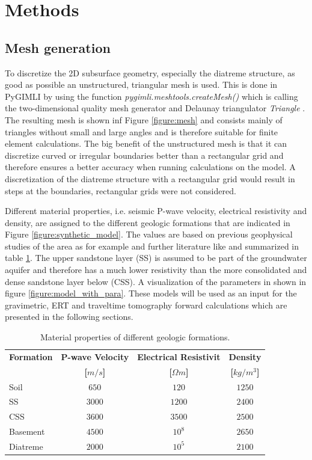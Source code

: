 \section{Methods}\label{section:Methods}

\subsection{Mesh generation}\label{section:Mesh}
To discretize the 2D subsurface geometry, especially the diatreme structure, as good as possible an unstructured, triangular mesh is used. This is done in PyGIMLI by using the function \textit{pygimli.meshtools.createMesh()} which is calling the two-dimensional quality mesh generator and Delaunay triangulator \textit{Triangle} \citep{shewchuk1996triangle}. The resulting mesh is shown inf Figure \ref{figure:mesh} and consists mainly of triangles without small and large angles and is therefore suitable for finite element calculations. The big benefit of the unstructured mesh is that it can discretize curved or irregular boundaries better than a rectangular grid and therefore ensures a better accuracy when running calculations on the model. A discretization of the diatreme structure with a rectangular grid would result in steps at the boundaries, rectangular grids were not considered.

Different material properties, i.e. seismic P-wave velocity, electrical resistivity and density, are assigned to the  different geologic formations that are indicated in Figure \ref{figure:synthetic_model}. The values are based on previous geophysical studies of the area as for example \citet{NiklasPlumpe.2015,TimGilberti.2020} and further literature like \citet{geldart2004problems,palacky1988resistivity} and summarized in table \ref{table:properties}. The upper sandstone layer (SS) is assumed to be part of the groundwater aquifer and therefore has a much lower resistivity than the more consolidated and dense sandstone layer below (CSS). A visualization of the parameters in shown in figure \ref{figure:model_with_para}. These models will be used as an input for the gravimetric, ERT and traveltime tomography forward calculations which are presented in the following sections.

\begin{table}[!htb]
\caption{Material properties of different geologic formations.}
\centering
\begin{tabular}{lccc}
\hline 
\textbf{Formation} & \textbf{P-wave Velocity}  & \textbf{Electrical Resistivit}  & \textbf{Density}  \\
& \textbf{[$m/s$]}  & \textbf{[$\Omega m$]}  & \textbf{[$kg/m^3$]}\\ \hline 
Soil & $650$ & $120$ & $1250$\\
SS & $3000$ & $1200$ & $2400$\\
CSS & $3600$ & $3500$ & $2500$\\
Basement & $4500$ & $10^8$ & $2650$\\
Diatreme & $2000$ & $10^5$ & $2100$\\
 \hline 
\end{tabular}
\label{table:properties}
\end{table}


